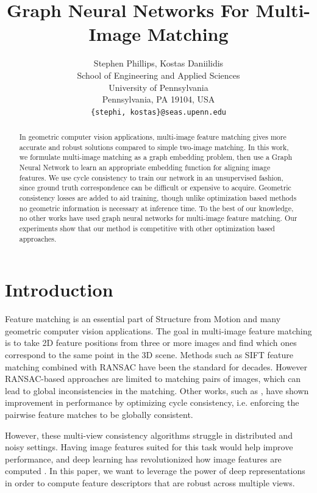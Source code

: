 \documentclass{article} %
\title{Graph Neural Networks For Multi-Image Matching}
\author{Stephen Phillips, Kostas Daniilidis \\
School of Engineering and Applied Sciences \\
University of Pennsylvania \\
Pennsylvania, PA 19104, USA \\
\texttt{\{stephi, kostas\}@seas.upenn.edu} \\
}
\begin{document}
\maketitle

\begin{abstract}
    In geometric computer vision applications, multi-image feature matching gives more accurate and robust solutions compared to simple two-image matching.
    In this work, we formulate multi-image matching as a graph embedding problem, then use a Graph Neural Network to learn an appropriate embedding function for aligning image features.
    We use cycle consistency to train our network in an unsupervised fashion, since ground truth correspondence can be difficult or expensive to acquire.
    Geometric consistency losses are added to aid training, though unlike optimization based methods no geometric information is necessary at inference time.
    To the best of our knowledge, no other works have used graph neural networks for multi-image feature matching.
    Our experiments show that our method is competitive with other optimization based approaches.
\end{abstract}

\section{Introduction}

Feature matching is an essential part of Structure from Motion and many geometric computer vision applications.
The goal in multi-image feature matching is to take 2D feature positions from three or more images and find which ones correspond to the same point in the 3D scene.
Methods such as SIFT feature matching \citep{lowe2004distinctive} combined with RANSAC \citep{fischler1981random} have been the standard for decades.
However RANSAC-based approaches are limited to matching pairs of images, which can lead to global inconsistencies in the matching.
Other works, such as \cite{wang2017multi}, have shown improvement in performance by optimizing cycle consistency, i.e. enforcing the pairwise feature matches to be globally consistent.

However, these multi-view consistency algorithms struggle in distributed and noisy settings.
Having image features suited for this task would help improve performance, and deep learning has revolutionized how image features are computed \citep{yi2016lift}.
In this paper, we want to leverage the power of deep representations in order to compute feature descriptors that are robust across multiple views.
\end{document}

